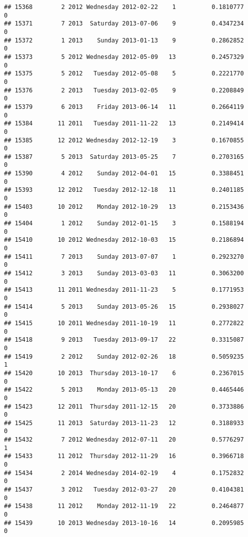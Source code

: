 \documentclass[
]{article}
\begin{document}
\begin{verbatim}
## 15368        2 2012 Wednesday 2012-02-22    1          0.1810777             0
## 15371        7 2013  Saturday 2013-07-06    9          0.4347234             0
## 15372        1 2013    Sunday 2013-01-13    9          0.2862852             0
## 15373        5 2012 Wednesday 2012-05-09   13          0.2457329             0
## 15375        5 2012   Tuesday 2012-05-08    5          0.2221770             0
## 15376        2 2013   Tuesday 2013-02-05    9          0.2208849             0
## 15379        6 2013    Friday 2013-06-14   11          0.2664119             0
## 15384       11 2011   Tuesday 2011-11-22   13          0.2149414             0
## 15385       12 2012 Wednesday 2012-12-19    3          0.1670855             0
## 15387        5 2013  Saturday 2013-05-25    7          0.2703165             0
## 15390        4 2012    Sunday 2012-04-01   15          0.3388451             0
## 15393       12 2012   Tuesday 2012-12-18   11          0.2401185             0
## 15403       10 2012    Monday 2012-10-29   13          0.2153436             0
## 15404        1 2012    Sunday 2012-01-15    3          0.1588194             0
## 15410       10 2012 Wednesday 2012-10-03   15          0.2186894             0
## 15411        7 2013    Sunday 2013-07-07    1          0.2923270             0
## 15412        3 2013    Sunday 2013-03-03   11          0.3063200             0
## 15413       11 2011 Wednesday 2011-11-23    5          0.1771953             0
## 15414        5 2013    Sunday 2013-05-26   15          0.2938027             0
## 15415       10 2011 Wednesday 2011-10-19   11          0.2772822             0
## 15418        9 2013   Tuesday 2013-09-17   22          0.3315087             0
## 15419        2 2012    Sunday 2012-02-26   18          0.5059235             1
## 15420       10 2013  Thursday 2013-10-17    6          0.2367015             0
## 15422        5 2013    Monday 2013-05-13   20          0.4465446             0
## 15423       12 2011  Thursday 2011-12-15   20          0.3733886             0
## 15425       11 2013  Saturday 2013-11-23   12          0.3188933             0
## 15432        7 2012 Wednesday 2012-07-11   20          0.5776297             1
## 15433       11 2012  Thursday 2012-11-29   16          0.3966718             0
## 15434        2 2014 Wednesday 2014-02-19    4          0.1752832             0
## 15437        3 2012   Tuesday 2012-03-27   20          0.4104381             0
## 15438       11 2012    Monday 2012-11-19   22          0.2464877             0
## 15439       10 2013 Wednesday 2013-10-16   14          0.2095985             0

\end{verbatim}
\end{document}
